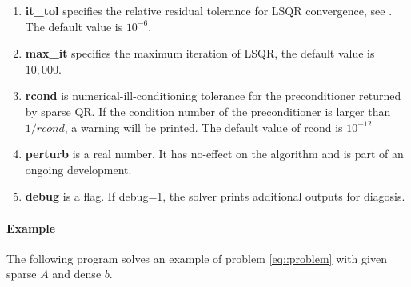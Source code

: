 \documentclass[english,11pt]{article}
\begin{document}
\begin{itemize}
\begin{enumerate}
			\item {\bf it_tol} specifies the relative residual tolerance for LSQR convergence, see \cite{Paige:1982aa}. The default value is $10^{-6}$.

			\item {\bf max_it} specifies the maximum iteration of LSQR, the default value is $10,000$. 

			\item {\bf rcond} is numerical-ill-conditioning tolerance for the preconditioner returned by sparse QR. If the condition number of the preconditioner is larger than $1/rcond$, a warning will be printed. The default value of rcond is $10^{-12}$

			\item {\bf perturb} is a real number. It has no-effect on the algorithm and is part of an ongoing development. 

			\item {\bf debug} is a flag. If debug=1, the solver prints additional outputs for diagosis. 
		\end{enumerate}
		

	\end{itemize}

\paragraph{Example}

The following program solves an example of problem \eqref{eq::problem} with given sparse $A$ and dense $b$. 
\end{document}

